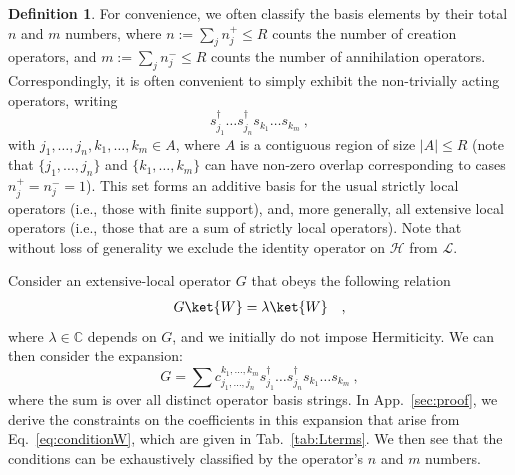 \documentclass[prx,letterpaper,aps,superscriptaddress,floatfix,twocolumn,nofootinbib]{revtex4-2}
\theoremstyle{definition}
\newtheorem{defin}{Definition}
\begin{document}
\begin{defin}
%
For convenience, we often classify the basis elements by their total $n$ and $m$  numbers, where $n := \sum_j n_j^+ \leq R$ counts the number of creation operators, and $m := \sum_j n_j^- \leq R$ counts the number of annihilation operators.
%
Correspondingly, it is often convenient to simply exhibit the non-trivially acting operators, writing
\begin{equation}
s_{j_1}^\dagger \dots s_{j_n}^\dagger s_{k_1} \dots s_{k_m} ~,
\end{equation}
with $j_1, \dots, j_n, k_1, \dots, k_m \in A$, where $A$ is a contiguous region of size $|A|\leq R$ (note that $\{j_1, \dots, j_n\}$ and $\{k_1, \dots, k_m\}$ can have non-zero overlap corresponding to cases $n_j^+ \!=\! n_j^- \!=\! 1$).
%
This set forms an additive basis for the usual strictly local operators (i.e., those with finite support), and, more generally, all extensive local operators (i.e., those that are a sum of strictly local operators).
%
Note that without loss of generality we exclude the identity operator on $\mathcal{H}$ from $\mathcal{L}$.
\end{defin}
%

%
Consider an extensive-local operator $G$ that obeys the following relation
\begin{align}
    G\ket{W} = \lambda \ket{W} \quad,
    \label{eq:conditionW}
\end{align}
where $\lambda \in \mathbb{C}$ depends on $G$, and we initially do not impose Hermiticity.
%
We can then consider the expansion:
\begin{equation}
G = \sum  c_{j_1, \dots, j_n}^{k_1, \dots, k_m} s_{j_1}^\dagger \dots s_{j_n}^\dagger s_{k_1} \dots s_{k_m} ~,
\label{eq:Gexpand}
\end{equation}
where the sum is over all distinct operator basis strings.
%
In App.~\ref{sec:proof}, we derive the constraints on the coefficients in this expansion that arise from Eq.~\eqref{eq:conditionW}, which are given in Tab.~\ref{tab:Lterms}.
%
We then see that the conditions can be exhaustively classified by the operator's $n$ and $m$ numbers.
%
\end{document}
